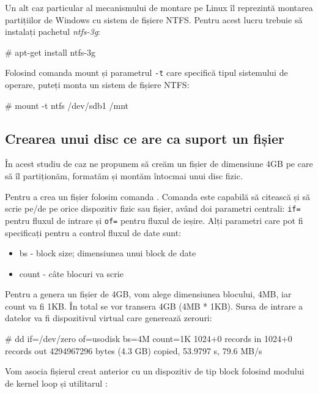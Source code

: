 Un alt caz particular al mecanismului de montare pe Linux îl reprezintă montarea
partițiilor de Windows cu sistem de fișiere NTFS. Pentru acest lucru trebuie să
instalați pachetul \textit{ntfs-3g}:
\begin{screen}
# apt-get install ntfs-3g
\end{screen}

Folosind comanda mount și parametrul \texttt{-t} care specifică tipul sistemului
de operare, puteți monta un sistem de fișiere NTFS:

\begin{screen}
# mount -t ntfs /dev/sdb1 /mnt
\end{screen}

\subsection{Crearea unui disc ce are ca suport un fișier}
\label{sec:storage-mount-create}

În acest studiu de caz ne propunem să creăm un fișier de dimensiune 4GB pe care
să îl partiționăm, formatăm și montăm întocmai unui disc fizic.

Pentru a crea un fișier folosim comanda . Comanda  este capabilă
să citească și să scrie pe/de pe orice dispozitiv fizic sau fișier, având doi
parametri centrali: \texttt{if=} pentru fluxul de intrare și \texttt{of=} pentru
fluxul de ieșire. Alți parametri care pot fi specificați pentru a control
fluxul de date sunt:

\begin{itemize}
	\item bs - block size; dimensiunea unui block de date
	\item count - câte blocuri va scrie
\end{itemize}

Pentru a genera un fișier de 4GB, vom alege dimensiunea blocului, 4MB, iar count
va fi 1KB. În total se vor transera 4GB (4MB * 1KB). Sursa de intrare a datelor
va fi dispozitivul virtual  care generează zerouri:

\begin{screen}
# dd if=/dev/zero of=usodisk bs=4M count=1K
1024+0 records in
1024+0 records out
4294967296 bytes (4.3 GB) copied, 53.9797 s, 79.6 MB/s
\end{screen}

Vom asocia fișierul creat anterior cu un dispozitiv de tip block folosind
modului de kernel loop și utilitarul :


